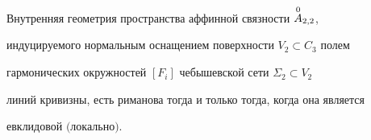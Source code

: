  





\begin{thm} 


Внутренняя геометрия пространства аффинной связности $\overset{0}{A}{}_{2,2}$, 


индуцируемого нормальным оснащением поверхности $V_2\subset C_3$ полем 


гармонических окружностей $[F_i]$ чебышевской сети $\Sigma_2\subset V_2$ 


линий кривизны, есть риманова тогда и только тогда, когда она является 


евклидовой $($локально$)$. 


\end{thm} 


 


 


